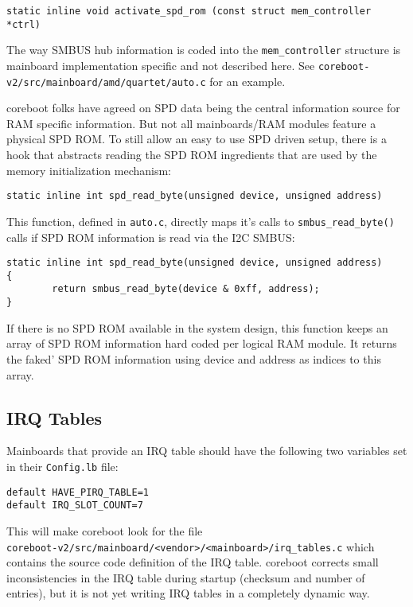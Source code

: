 \documentclass[titlepage,12pt]{article}
\begin{document}
\begin{verbatim}
static inline void activate_spd_rom (const struct mem_controller *ctrl)
\end{verbatim}

The way SMBUS hub information is coded into the \texttt{mem\_controller}
structure is mainboard implementation specific and not
described here.  See \texttt{coreboot-v2/src/mainboard/amd/quartet/auto.c}
for an example.

coreboot folks have agreed on SPD data being the central information
source for RAM specific information. But not all mainboards/RAM
modules feature a physical SPD ROM. To still allow an easy to use SPD
driven setup, there is a hook that abstracts reading the SPD ROM
ingredients that are used by the memory initialization mechanism:

\begin{verbatim}
static inline int spd_read_byte(unsigned device, unsigned address)
\end{verbatim}

This function, defined in \texttt{auto.c}, directly maps it's calls to
\texttt{smbus\_read\_byte()} calls if SPD ROM information is read via
the I2C SMBUS:

\begin{verbatim}
static inline int spd_read_byte(unsigned device, unsigned address)
{
        return smbus_read_byte(device & 0xff, address);
}
\end{verbatim}

If there is no SPD ROM available in the system design, this function
keeps an array of SPD ROM information hard coded per logical RAM module.
It returns the faked' SPD ROM information using device and address
as indices to this array.


\subsection {IRQ Tables}

Mainboards that provide an IRQ table should have the following two
variables set in their \texttt{Config.lb} file:

\begin{verbatim}
default HAVE_PIRQ_TABLE=1
default IRQ_SLOT_COUNT=7
\end{verbatim}

This will make coreboot look for the file \\
\texttt{coreboot-v2/src/mainboard/<vendor>/<mainboard>/irq\_tables.c} which
contains the source code definition of the IRQ table. coreboot corrects
small inconsistencies in the IRQ table during startup (checksum and
number of entries), but it is not yet writing IRQ tables in a completely 
dynamic way.
\end{document}

